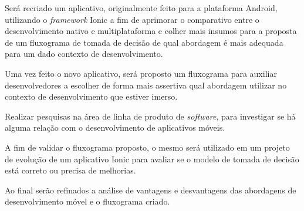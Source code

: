\begin{table}[h]
\caption{Cronograma inicial para o TCC 2}
\label{tab:cronograma}
\end{table}

Será recriado um aplicativo, originalmente feito para a plataforma Android, utilizando o \textit{framework} Ionic a fim de aprimorar o comparativo entre o desenvolvimento nativo e multiplataforma e colher mais insumos
para a proposta de um fluxograma de tomada de decisão de qual abordagem é mais adequada para um dado contexto de desenvolvimento.

Uma vez feito o novo aplicativo, será proposto um fluxograma para auxiliar desenvolvedores a escolher de forma mais assertiva qual abordagem utilizar no contexto de desenvolvimento que estiver imerso.

Realizar pesquisas na área de linha de produto de \textit{software}, para investigar se há alguma relação com o desenvolvimento de aplicativos móveis.

A fim de validar o fluxograma proposto, o mesmo será utilizado em um projeto de evolução de um aplicativo Ionic para avaliar se o modelo de tomada de decisão está correto ou precisa de melhorias.

Ao final serão refinados a análise de vantagens e desvantagens das abordagens de desenvolvimento móvel e o fluxograma criado.